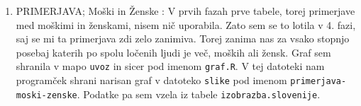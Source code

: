 \documentclass[11pt,a4paper]{article}
\begin{document}
\begin{enumerate} 
\item{PRIMERJAVA; Moški in Ženske} : V prvih fazah prve tabele, torej primerjave med moškimi in ženskami, nisem nič uporabila. Zato sem se to lotila v 4. fazi, saj se mi ta primerjava zdi zelo zanimiva. Torej zanima nas za vsako stopnjo posebaj katerih po spolu ločenih ljudi je več, moških ali žensk. Graf sem shranila v mapo \verb|uvoz| in sicer pod imenom \verb|graf.R|. V tej datoteki nam programček shrani narisan graf v datoteko \verb|slike| pod imenom \verb|primerjava-moski-zenske|. Podatke pa sem vzela iz tabele \verb|izobrazba.slovenije|.


\end{enumerate}
\end{document}
